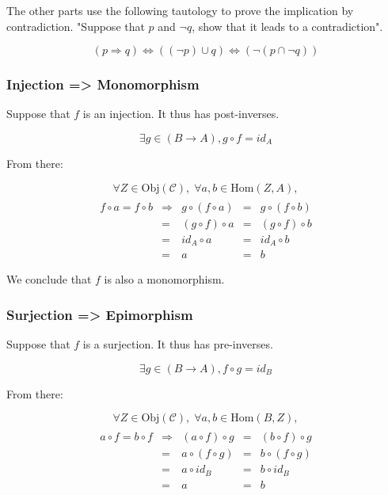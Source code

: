 \documentclass[12pt, letterpaper, twoside]{article}
\begin{document}
The other parts use the following tautology to prove the implication by contradiction. "Suppose that $p$ and $\neg q$, show that it leads to a contradiction".

$$
(p \Rightarrow q)
\Leftrightarrow ((\neg  p) \cup      q )
\Leftrightarrow ( \neg (p  \cap \neg q))
$$

\subsubsection{Injection => Monomorphism}

Suppose that $f$ is an injection. It thus has post-inverses.

$$\exists g \in (B \to A), g \circ f = id_A$$

From there:

$$
\forall Z \in \text{Obj}(\mathcal{C}), \;
\forall a, b \in \text{Hom}(Z, A),
$$
$$
\begin{array}{ccccc} \\
f \circ a = f \circ b & \Rightarrow &  g \circ (f  \circ a) &=&  g \circ (f  \circ b) \\
                      & =           & (g \circ  f) \circ a  &=& (g \circ  f) \circ b  \\
                      & =           &         id_A \circ a  &=&         id_A \circ b  \\
                      & =           &                    a  &=&                    b
\end{array}
$$

We conclude that $f$ is also a monomorphism.


\subsubsection{Surjection => Epimorphism}

Suppose that $f$ is a surjection. It thus has pre-inverses.

$$\exists g \in (B \to A), f \circ g = id_B$$

From there:

$$
\forall Z \in \text{Obj}(\mathcal{C}), \;
\forall a, b \in \text{Hom}(B, Z),
$$
$$
\begin{array}{ccccc} \\
a \circ f = b \circ f & \Rightarrow & (a \circ  f) \circ g  &=& (b \circ  f) \circ g  \\
                      & =           &  a \circ (f  \circ g) &=&  b \circ (f  \circ g) \\
                      & =           &  a \circ  id_B        &=&  b \circ  id_B        \\
                      & =           &  a                    &=&  b
\end{array}
$$
\end{document}
